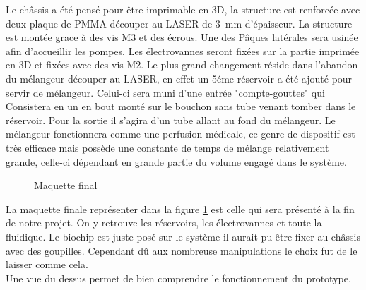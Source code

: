 \documentclass[a4paper, 11pt]{article}
\begin{document}
Le châssis a été pensé pour être imprimable en 3D, la structure est renforcée avec deux
plaque de PMMA découper au LASER de 3 mm d'épaisseur. La structure est montée grace à
des vis M3 et des écrous. Une des Pâques latérales sera usinée afin d'accueillir les pompes.
Les électrovannes seront fixées sur la partie imprimée en 3D et fixées avec des vis M2.
Le plus grand changement réside dans l'abandon du mélangeur découper au LASER, en effet un 5éme réservoir a été ajouté pour servir de mélangeur. Celui-ci sera muni d'une entrée "compte-gouttes" qui
Consistera en un en bout monté sur le bouchon sans tube venant tomber dans le réservoir.
Pour la sortie il s'agira d'un tube allant au fond du mélangeur.
Le mélangeur fonctionnera comme une perfusion médicale, ce genre de dispositif est très efficace
mais possède une constante de temps de mélange relativement grande, celle-ci dépendant en
grande partie du volume engagé dans le système.
\newpage
\begin{figure}[H]
    \centering
    \caption{Maquette final}
    \label{fig:Maquette}
\end{figure}
La maquette finale représenter dans la figure \ref{fig:Maquette} est celle qui sera présenté
à la fin de notre projet.
On y retrouve les réservoirs, les électrovannes et toute la fluidique. Le biochip est juste posé sur le système
il aurait pu être fixer au châssis avec des goupilles. Cependant dû aux nombreuse manipulations
le choix fut de le laisser comme cela. \\
Une vue du dessus permet de bien comprendre le fonctionnement du prototype.
\end{document}
